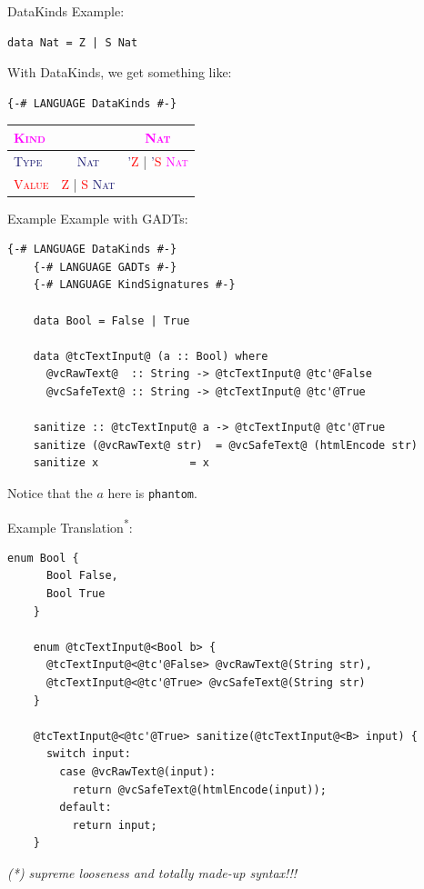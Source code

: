 \documentclass[xcolor={usenames,dvipsnames}]{beamer}
\newcommand{\htycon}[1]{\textcolor{MidnightBlue}{\textsc{#1}}}
\newcommand{\hvalcon}[1]{\textcolor{Red}{\textsc{#1}}}
\newcommand{\hkind}[1]{\textcolor{Fuchsia}{\textsc{#1}}}
\begin{document}
\begin{frame}[fragile]{DataKinds}
  Example:
  \begin{lstlisting}[style=hask]
    data Nat = Z | S Nat
  \end{lstlisting}

  With DataKinds, we get something like:
  \begin{lstlisting}[style=hask]
    {-# LANGUAGE DataKinds #-}
  \end{lstlisting}
  \begin{tabular}{l || c | c}
    \hkind{Kind} & \ & \hkind{Nat} \\
    \hline \htycon{Type} & \htycon{Nat} & \htycon{'}\hvalcon{Z} | \htycon{'}\hvalcon{S} \hkind{Nat} \\
    \hline \hvalcon{Value} & \hvalcon{Z} | \hvalcon{S} \htycon{Nat} & \ \\
  \end{tabular}
\end{frame}

\begin{frame}[fragile]{Example}
  Example with GADTs:
  \begin{lstlisting}[style=hask]
    {-# LANGUAGE DataKinds #-}
    {-# LANGUAGE GADTs #-}
    {-# LANGUAGE KindSignatures #-}

    data Bool = False | True

    data @tcTextInput@ (a :: Bool) where
      @vcRawText@  :: String -> @tcTextInput@ @tc'@False
      @vcSafeText@ :: String -> @tcTextInput@ @tc'@True

    sanitize :: @tcTextInput@ a -> @tcTextInput@ @tc'@True
    sanitize (@vcRawText@ str)  = @vcSafeText@ (htmlEncode str)
    sanitize x              = x
  \end{lstlisting}
  \scriptsize{Notice that the $a$ here is \texttt{phantom}.}
\end{frame}

\begin{frame}[fragile]{Example}
  Translation\textsuperscript{*}:
  \begin{lstlisting}[style=hask]
    enum Bool {
      Bool False,
      Bool True
    }

    enum @tcTextInput@<Bool b> {
      @tcTextInput@<@tc'@False> @vcRawText@(String str),
      @tcTextInput@<@tc'@True> @vcSafeText@(String str)
    }

    @tcTextInput@<@tc'@True> sanitize(@tcTextInput@<B> input) {
      switch input:
        case @vcRawText@(input):
          return @vcSafeText@(htmlEncode(input));
        default:
          return input;
    }
  \end{lstlisting}
  \textit{\tiny{(*) supreme looseness and totally made-up syntax!!!}}
\end{frame}
\end{document}
